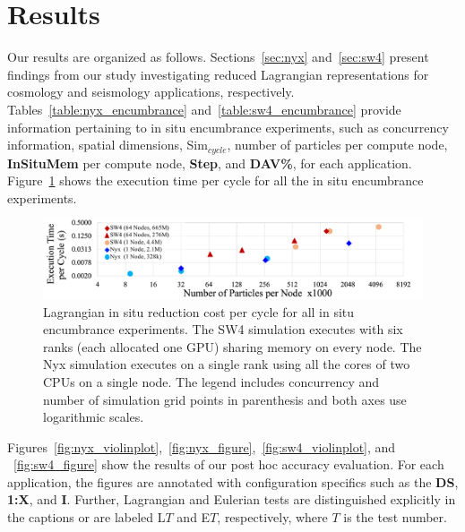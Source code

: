 \documentclass[runningheads]{llncs}
\begin{document}
\section{Results}
\label{sec:results}
Our results are organized as follows.
%
Sections~\ref{sec:nyx} and~\ref{sec:sw4} present findings from our study investigating reduced Lagrangian representations for cosmology and seismology applications, respectively.
%
%
Tables~\ref{table:nyx_encumbrance} and~\ref{table:sw4_encumbrance} provide information pertaining to in situ encumbrance experiments, such as concurrency information, spatial dimensions, Sim$_{cycle}$, number of particles per compute node, \textbf{InSituMem} per compute node, \textbf{Step}, and \textbf{DAV\%}, for each application.
%
Figure~\ref{fig:insitucost} shows the execution time per cycle for all the in situ encumbrance experiments. %
%
\begin{figure}[!t]
\centering
\includegraphics[width=\linewidth]{InSituCost_Stretch2.pdf}
\vspace{-5mm}
\caption{Lagrangian in situ reduction cost per cycle for all in situ encumbrance experiments. The SW4 simulation executes with six ranks (each allocated one GPU) sharing memory on every node. The Nyx simulation executes on a single rank using all the cores of two CPUs on a single node. The legend includes concurrency and number of simulation grid points in parenthesis and both axes use logarithmic scales.}
\vspace{-5mm}
\label{fig:insitucost}
\end{figure}
%
Figures~\ref{fig:nyx_violinplot},~\ref{fig:nyx_figure},~\ref{fig:sw4_violinplot}, and ~\ref{fig:sw4_figure} show the results of our post hoc accuracy evaluation.
%
For each application, the figures are annotated with configuration specifics such as the \textbf{DS}, \textbf{1:X}, and \textbf{I}.
%
Further, Lagrangian and Eulerian tests are distinguished explicitly in the captions or are labeled L$T$ and E$T$, respectively, where $T$ is the test number.
%

\vspace{-3mm}
\end{document}
